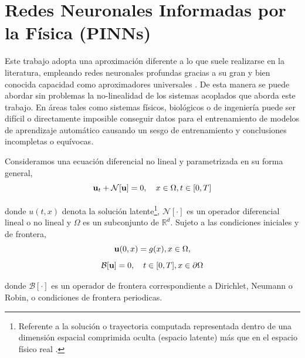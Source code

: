 



\section{Redes Neuronales Informadas por la Física (PINNs)}
Este trabajo adopta una aproximación diferente a lo que suele realizarse en la literatura, empleando redes neuronales profundas gracias a su gran y bien conocida capacidad como aproximadores 
universales \cite{HORNIK1989359}. De esta manera se puede abordar sin problemas la no-linealidad de los sistemas acoplados que aborda este trabajo. En áreas tales como sistemas físicos, biológicos o de ingeniería 
puede ser difícil o directamente imposible conseguir datos para el entrenamiento
de modelos de aprendizaje automático causando un sesgo de entrenamiento y conclusiones incompletas o equívocas. 

Consideramos una ecuación diferencial no lineal y parametrizada en su forma general, 
\begin{equation}
    \mathbf{u}_t + \mathcal{N}[\mathbf{u}] = 0, \quad x\in \Omega, t\in[0,T]
    \label{eq:nonlinearDiffEq}
\end{equation}

donde $u(t,x)$ denota la solución latente\footnote{Referente a la solución o trayectoria computada representada dentro de una dimensión espacial comprimida oculta (espacio latente) más que en el espacio físico real \cite{nockolds2025lilanlinearlatentnetwork}.}, 
$\mathcal{N}[\cdot]$ es un operador diferencial lineal o no lineal y $\Omega$ es un subconjunto de $\mathbb{R}^d$. Sujeto a las condiciones iniciales y de frontera,
\begin{equation}
    \mathbf{u}(0,x) = g(x), x\in \Omega,
    \label{eq:initilCond}
\end{equation}
\begin{equation}
    \mathcal{B}[\mathbf{u}] = 0, \quad t\in[0,T], x\in \partial \Omega
    \label{eq:boundaryCond}
\end{equation}

donde $\mathcal{B}[\cdot]$ es un operador de frontera correspondiente a Dirichlet, Neumann o Robin, o condiciones de frontera periodicas.

